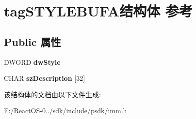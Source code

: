 \hypertarget{structtag_s_t_y_l_e_b_u_f_a}{}\section{tag\+S\+T\+Y\+L\+E\+B\+U\+F\+A结构体 参考}
\label{structtag_s_t_y_l_e_b_u_f_a}
\subsection*{Public 属性}
\begin{DoxyCompactItemize}
\item 
\mbox{\label{structtag_s_t_y_l_e_b_u_f_a_a85755d1c446c22da16eb488834daf138}} 
D\+W\+O\+RD {\bfseries dw\+Style}
\item 
\mbox{\label{structtag_s_t_y_l_e_b_u_f_a_ab3329ee03fb506b9670d4a15c7c12a4e}} 
C\+H\+AR {\bfseries sz\+Description} \mbox{[}32\mbox{]}
\end{DoxyCompactItemize}


该结构体的文档由以下文件生成\+:\begin{DoxyCompactItemize}
\item 
E\+:/\+React\+O\+S-\/0../sdk/include/psdk/imm.\+h\end{DoxyCompactItemize}
